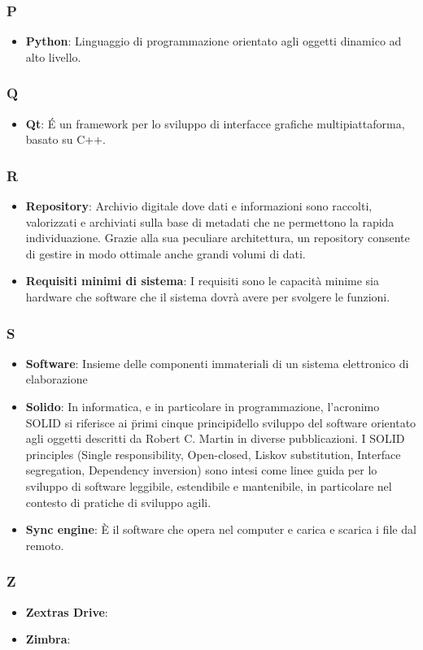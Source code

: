 \subsubsection{P}
\begin{itemize}
	\item \textbf{Python}: Linguaggio di programmazione orientato agli oggetti dinamico ad alto livello.
\end{itemize}

\subsubsection{Q}
\begin{itemize}
\item \textbf{Qt}: É un framework per lo sviluppo di interfacce grafiche multipiattaforma, basato su C++.
\end{itemize}

\subsubsection{R}
\begin{itemize}
	\item \textbf{Repository}: Archivio digitale dove dati e informazioni sono raccolti, valorizzati e archiviati sulla base di metadati che ne permettono la rapida individuazione. Grazie alla sua peculiare architettura, un repository consente di gestire in modo ottimale anche grandi volumi di dati.
	\item \textbf{Requisiti minimi di sistema}: I requisiti sono le capacità minime sia hardware che software che il sistema dovrà avere per svolgere le funzioni.
\end{itemize}

\subsubsection{S}
\begin{itemize}
	\item \textbf{Software}: Insieme delle componenti immateriali di un sistema elettronico di elaborazione
	\item \textbf{Solido}: In informatica, e in particolare in programmazione, l'acronimo SOLID si riferisce ai \"primi cinque principi\" dello sviluppo del software orientato agli oggetti descritti da Robert C. Martin in diverse pubblicazioni. I SOLID principles (Single responsibility, Open-closed, Liskov substitution, Interface segregation, Dependency inversion) sono intesi come linee guida per lo sviluppo di software leggibile, estendibile e mantenibile, in particolare nel contesto di pratiche di sviluppo agili.
	\item \textbf{Sync engine}: È il software che opera nel computer e carica e scarica i file dal remoto.
\end{itemize}

\subsubsection{Z}
\begin{itemize}
	\item \textbf{Zextras Drive}:
	\item \textbf{Zimbra}:
\end{itemize}